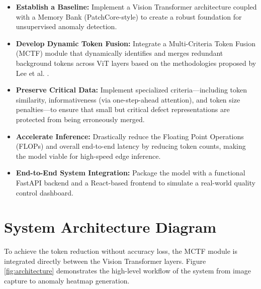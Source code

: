 \documentclass[12pt]{article}
\begin{document}
\begin{itemize}
    \item \textbf{Establish a Baseline:} Implement a Vision Transformer architecture coupled with a Memory Bank (PatchCore-style) to create a robust foundation for unsupervised anomaly detection.
    \item \textbf{Develop Dynamic Token Fusion:} Integrate a Multi-Criteria Token Fusion (MCTF) module that dynamically identifies and merges redundant background tokens across ViT layers based on the methodologies proposed by Lee et al. \cite{lee2023multi}.
    \item \textbf{Preserve Critical Data:} Implement specialized criteria---including token similarity, informativeness (via one-step-ahead attention), and token size penalties---to ensure that small but critical defect representations are protected from being erroneously merged.
    \item \textbf{Accelerate Inference:} Drastically reduce the Floating Point Operations (FLOPs) and overall end-to-end latency by reducing token counts, making the model viable for high-speed edge inference.
    \item \textbf{End-to-End System Integration:} Package the model with a functional FastAPI backend and a React-based frontend to simulate a real-world quality control dashboard.
\end{itemize}

\section{System Architecture Diagram}
To achieve the token reduction without accuracy loss, the MCTF module is integrated directly between the Vision Transformer layers. Figure \ref{fig:architecture} demonstrates the high-level workflow of the system from image capture to anomaly heatmap generation.
\end{document}
